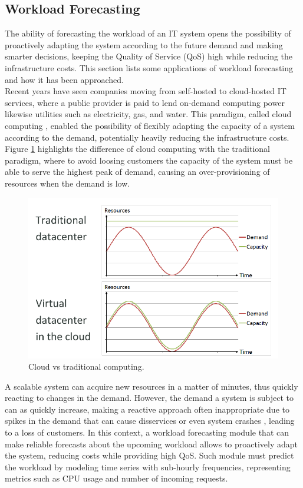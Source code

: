 \documentclass[a4paper, 12pt]{article} %
\begin{document}
	\subsection{Workload Forecasting } \label{ssec:workload_forecasting}
	The ability of forecasting the workload of an IT system opens the possibility of proactively adapting the system according to the future demand and making smarter decisions, keeping the Quality of Service (QoS) high while reducing the infrastructure costs. This section lists some applications of workload forecasting and how it has been approached.\\
	Recent years have seen companies moving from self-hosted to cloud-hosted  IT services, where a public provider is paid to lend on-demand computing power likewise utilities such as electricity, gas, and water. This paradigm, called cloud computing \cite{CloudComputing}, enabled the possibility of flexibly adapting the capacity of a system according to the demand, potentially heavily reducing the infrastructure costs.  Figure \ref{fig:cloud_vs_traditional_computing} highlights the difference of cloud computing with the traditional paradigm, where to avoid loosing customers the capacity of the system must be able to serve the highest peak of demand, causing an over-provisioning of resources when the demand is low.\\
	\begin{figure}
		\includegraphics[width=\linewidth]{img/cloud_vs_traditional_computing.png}
		\caption{Cloud vs traditional computing.}
		\label{fig:cloud_vs_traditional_computing}
	\end{figure}
	A scalable system can acquire new resources in a matter of minutes, thus quickly reacting to changes in the demand. However, the demand a system is subject to can as quickly increase, making a reactive approach often inappropriate due to spikes in the demand that can cause disservices or even system crashes \cite{ArimaWorkloadPrediction}, leading to a loss of customers. In this context, a workload forecasting module that can make reliable forecasts about the upcoming workload allows to proactively adapt the system, reducing costs while providing high QoS. Such module must predict the workload by modeling time series with sub-hourly frequencies, representing metrics such as CPU usage and number of incoming requests.\\
\end{document}
